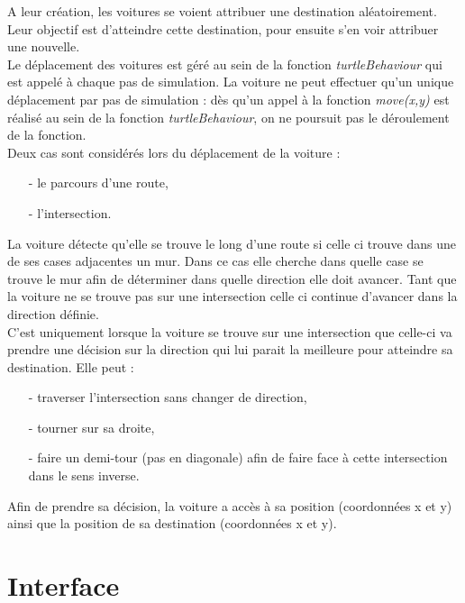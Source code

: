 \documentclass[a4paper,12pt]{report}
\begin{document}
A leur création, les voitures se voient attribuer une destination aléatoirement. Leur objectif est d'atteindre cette destination, pour ensuite s'en voir attribuer une nouvelle. \\

Le déplacement des voitures est géré au sein de la fonction \emph{turtleBehaviour} qui est appelé à chaque pas de simulation. La voiture ne peut effectuer qu'un unique déplacement par pas de simulation : dès qu'un appel à la fonction \emph{move(x,y)} est réalisé au sein de la fonction \emph{turtleBehaviour}, on ne poursuit pas le déroulement de la fonction. \\

Deux cas sont considérés lors du déplacement de la voiture :
\begin{itemize}
\item[-] le parcours d'une route,
\item[-] l'intersection. \\
\end{itemize}

La voiture détecte qu'elle se trouve le long d'une route si celle ci trouve dans une de ses cases adjacentes un mur. Dans ce cas elle cherche dans quelle case se trouve le mur afin de déterminer dans quelle direction elle doit avancer. Tant que la voiture ne se trouve pas sur une intersection celle ci continue d'avancer dans la direction définie. \\

C'est uniquement lorsque la voiture se trouve sur une intersection que celle-ci va prendre une décision sur la direction qui lui parait la meilleure pour atteindre sa destination. Elle peut :
\begin{itemize}
\item[-] traverser l'intersection sans changer de direction,
\item[-] tourner sur sa droite,
\item[-] faire un demi-tour (pas en diagonale) afin de faire face à cette intersection dans le sens inverse.\\
\end{itemize}

Afin de prendre sa décision, la voiture a accès à sa position (coordonnées x et y) ainsi que la position de sa destination (coordonnées x et y). 

\section{Interface}
\end{document}
